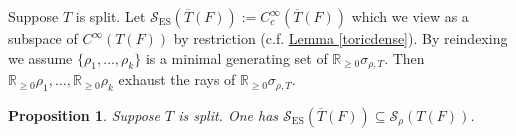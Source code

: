 \documentclass[10pt]{amsart}
\newtheorem{proposition}[theorem]{Proposition}
\theoremstyle{definition}
\numberwithin{equation}{section}
\numberwithin{equation}{subsection}
\newcommand{\ZZ}{\mathbb{Z}}
\begin{document}
Suppose $T$ is split. Let $\mathcal{S}_{\mathrm{ES}}(\overline{T}(F)):=C_c^\infty(\overline{T}(F))$ which we view as a subspace of $C^\infty(T(F))$ by restriction (c.f. \hyperref[toricdense]{Lemma \ref{toricdense}}). %
By reindexing we assume $\{\rho_1,\ldots,\rho_k\}$ is a minimal generating set of $\mathbb{R}_{\geq 0}\sigma_{\rho,T}$. Then $\mathbb{R}_{\geq 0}\rho_1,\ldots,\mathbb{R}_{\geq 0}\rho_k$ exhaust the rays of $\mathbb{R}_{\geq 0}\sigma_{\rho,T}$. 





\begin{proposition}\label{prop:ESinrho} Suppose $T$ is split. One has $\mathcal{S}_{\mathrm{ES}}(\overline{T}(F))\subseteq \mathcal{S}_\rho(T(F))$.
\end{proposition}
\end{document}
